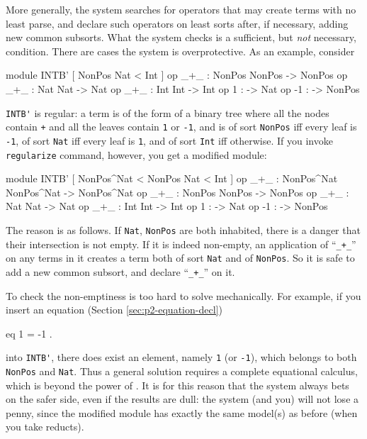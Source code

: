 \documentclass[a4paper]{memoir}
\begin{document}

More generally, the system searches for operators that may create
terms with no least parse, and declare such operators on least sorts
after, if necessary, adding new common subsorts. What the system
checks is a sufficient, but {\em not} necessary, condition. There are
cases the system is overprotective. As an example, consider
\begin{vvtm}
\begin{ccode}
  module INTB' {
    [ NonPos Nat < Int ]
    op _+_ : NonPos NonPos -> NonPos
    op _+_ : Nat Nat -> Nat
    op _+_ : Int Int -> Int
    op 1 : -> Nat
    op -1 : -> NonPos
  }
\end{ccode}
\end{vvtm}
\label{exs:intb'}
\verb|INTB'| is regular: a term is of the form of a binary tree where
all the nodes contain \verb|+| and all the leaves contain \verb|1| or
\verb|-1|, and is of sort \verb|NonPos| iff every leaf is \verb|-1|,
of sort \verb|Nat| iff every leaf is \verb|1|, and of sort \verb|Int|
iff otherwise. If you invoke \verb|regularize| command, however, you get
a modified module:
\begin{vvtm}
\begin{ccode}
  module INTB' {
    [ NonPos^Nat < NonPos Nat < Int ]
    op _+_ : NonPos^Nat NonPos^Nat -> NonPos^Nat
    op _+_ : NonPos NonPos -> NonPos
    op _+_ : Nat Nat -> Nat
    op _+_ : Int Int -> Int
    op 1 : -> Nat
    op -1 : -> NonPos
  }
\end{ccode}
\end{vvtm}
The reason is as follows. If \verb|Nat|, \verb|NonPos| are both
inhabited, there is a danger that their intersection is not
empty. If it is indeed non-empty,
an application of ``\verb|_+_|'' on any terms in it
creates a term both of sort
\verb|Nat| and of \verb|NonPos|. So it is safe to add a new common
subsort, and declare ``\verb|_+_|'' on it.

To check the non-emptiness is too hard to solve mechanically.
For example, if you insert an equation (Section \ref{sec:p2-equation-decl})
\begin{vvtm}
\begin{ccode}
  eq 1 = -1 .
\end{ccode}
\end{vvtm}
into \verb|INTB'|, there does exist an element, namely \verb|1|
(or \verb|-1|), which belongs to both \verb|NonPos| and \verb|Nat|.
Thus a general solution requires a complete equational calculus,
which is beyond the power of \cafeobj. It is for this reason that
the system always bets on the safer side, even if the results are dull:
the system (and you) will not lose a penny, since the modified
module has exactly the same model(s) as before (when you take reducts).
\end{document}
